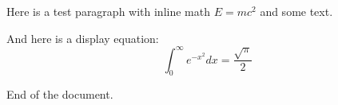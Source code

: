 
Here is a test paragraph with inline math $E = mc^2$ and some text.

And here is a display equation:
$$
\int_0^\infty e^{-x^2} dx = \frac{\sqrt{\pi}}{2}
$$

End of the document.


